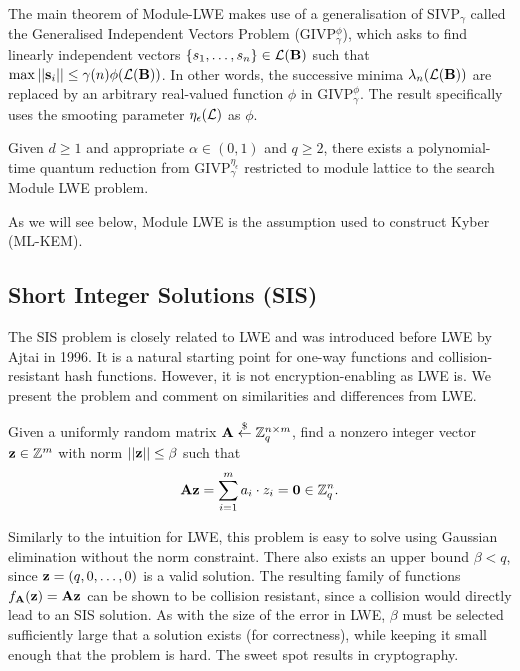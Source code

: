 The main theorem of Module-LWE makes use of a generalisation of SIVP$_\gamma$ called the Generalised Independent Vectors Problem (GIVP$_\gamma^\phi$), which asks to find linearly independent vectors $\{ s_1, \ldots, s_{n} \} \in \mathcal{L}(\mathbf{B})$ such that $\max || \mathbf{s}_i || \leq \gamma(n) \phi(\mathcal{L}(\mathbf{B}))$. In other words, the successive minima $\lambda_n(\mathcal{L}(\mathbf{B}))$ are replaced by an arbitrary real-valued function $\phi$ in GIVP$_\gamma^\phi$. The result specifically uses the smooting parameter $\eta_\epsilon(\mathcal{L})$ as $\phi$.

\begin{theorem}
    Given $d \geq 1$ and appropriate $\alpha \in (0,1)$ and $q \geq 2$, there exists a polynomial-time quantum reduction from GIVP$_\gamma^{\eta_\epsilon}$ restricted to module lattice to the search Module LWE problem.
\end{theorem}

As we will see below, Module LWE is the assumption used to construct Kyber (ML-KEM).

\subsection{Short Integer Solutions (SIS)}
The SIS problem is closely related to LWE and was introduced before LWE by Ajtai in 1996. It is a natural starting point for one-way functions and collision-resistant hash functions. However, it is not encryption-enabling as LWE is. We present the problem and comment on similarities and differences from LWE.

\begin{definition}
    Given a uniformly random matrix $\mathbf{A} \overset{\$}{\leftarrow} \mathbb{Z}_q^{n \times m}$, find a nonzero integer vector $\mathbf{z} \in \mathbb{Z}^m$ with norm $|| \mathbf{z} || \leq \beta$ such that \[ \mathbf{A} \mathbf{z} = \sum_{i = 1}^m a_i \cdot z_i = \mathbf{0} \in \mathbb{Z}_q^{n}. \]
\end{definition}
Similarly to the intuition for LWE, this problem is easy to solve using Gaussian elimination without the norm constraint. There also exists an upper bound $\beta < q$, since $\mathbf{z} = (q, 0, \ldots, 0)$ is a valid solution. The resulting family of functions $f_{\mathbf{A}}(\mathbf{z}) = \mathbf{A} \mathbf{z}$ can be shown to be collision resistant, since a collision would directly lead to an SIS solution. As with the size of the error in LWE, $\beta$ must be selected sufficiently large that a solution exists (for correctness), while keeping it small enough that the problem is hard. The sweet spot results in cryptography.

